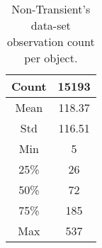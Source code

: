 \begin{table}
\centering
\begin{tabular}{c|c}
    \hline
    Count & 15193 \\
    \hline
    Mean & 118.37 \\
    Std & 116.51 \\
    Min & 5 \\
    25\% & 26 \\
    50\% & 72 \\
    75\% & 185 \\
    Max & 537 \\
    \hline
\end{tabular}
\caption{Non-Transient's data-set observation count per object.}
\label{Non-Transient-Observation-Count}
\end{table}